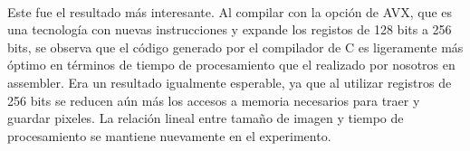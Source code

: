 \documentclass[a4paper]{article}
\begin{document}
\noindent%
\begin{minipage}{\linewidth}%
\end{minipage}
\ \

Este fue el resultado más interesante. Al compilar con la opción de AVX, que es una tecnología con nuevas instrucciones y expande los registos de 128 bits a 256 bits, se observa que el código generado por el compilador de C es ligeramente más óptimo en términos de tiempo de procesamiento que el realizado por nosotros en assembler. Era un resultado igualmente esperable, ya que al utilizar registros de 256 bits se reducen aún más los accesos a memoria necesarios para traer y guardar pixeles. La relación lineal entre tamaño de imagen y tiempo de procesamiento se mantiene nuevamente en el experimento.  
\end{document}
